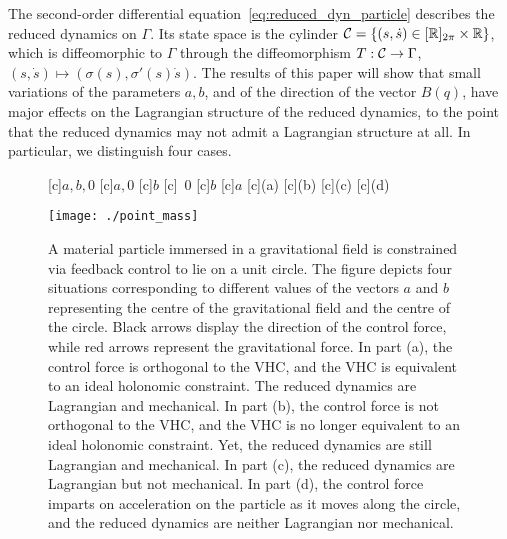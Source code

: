 The second-order differential equation~\eqref{eq:reduced_dyn_particle}
describes the reduced dynamics on $\Gamma$. Its state space is the
cylinder ${\cal C}=\{(s,\dot s) \in [\mathbb{R}]_{2\pi} \times \mathbb{R}\}$, which
is diffeomorphic to $\Gamma$ through the diffeomorphism $T : {\cal
	C}\to \Gamma$, $(s,\dot s) \mapsto (\sigma(s), \sigma'(s) \dot
s)$. The results of this paper will show that small variations of the
parameters $a, b$, and of the direction of the vector $B(q)$, have
major effects on the Lagrangian structure of the reduced dynamics, to
the point that the reduced dynamics may not admit a Lagrangian
structure at all. In particular, we distinguish four cases.
\begin{figure}
	{\footnotesize $a,b,0$}
	{\footnotesize $a,0$}
	{\footnotesize $b$}
	{\ \footnotesize $0$}
	{\footnotesize $b$}
	{\footnotesize $a$}
	{(a)}
	{(b)}
	{(c)}
	{(d)}
	\centerline{\texttt{[image: ./point\_mass]}}
	\caption{A material particle immersed in a gravitational field is
		constrained via feedback control to lie on a unit circle. The figure
		depicts four situations corresponding to different values of the
		vectors $a$ and $b$ representing the centre of the gravitational
		field and the centre of the circle.  Black arrows display the
		direction of the control force, while red arrows represent the
		gravitational force. In part (a), the control force is orthogonal to
		the VHC, and the VHC is equivalent to an ideal holonomic
		constraint. The reduced dynamics are Lagrangian and mechanical. In
		part (b), the control force is not orthogonal to the VHC, and the
		VHC is no longer equivalent to an ideal holonomic constraint. Yet,
		the reduced dynamics are still Lagrangian and mechanical. In part
		(c), the reduced dynamics are Lagrangian but not mechanical. In part
		(d), the control force imparts on acceleration on the particle as it
		moves along the circle, and the reduced dynamics are neither
		Lagrangian nor mechanical.}
	\label{fig:point_mass}
\end{figure}

